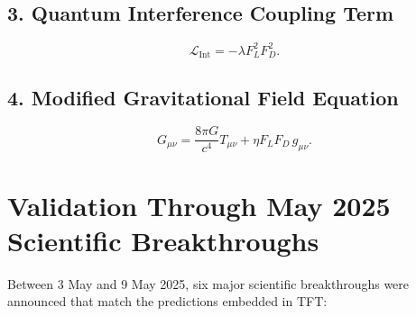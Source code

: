 \documentclass[11pt]{article}
\begin{document}
\subsection*{3. Quantum Interference Coupling Term}
\begin{equation}
\mathcal{L}_{\text{Int}} = -\lambda F_L^2 F_D^2.
\end{equation}

\subsection*{4. Modified Gravitational Field Equation}
\begin{equation}
G_{\mu \nu} = \frac{8\pi G}{c^4} T_{\mu \nu} + \eta F_L F_D \, g_{\mu \nu}.
\end{equation}

\section*{Validation Through May 2025 Scientific Breakthroughs}

Between 3 May and 9 May 2025, six major scientific breakthroughs were announced that match the predictions embedded in TFT:
\end{document}
